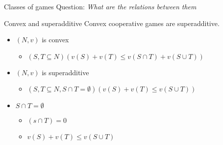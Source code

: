\documentclass{beamer}
\begin{document}
\begin{frame}{Classes of games}
    Question: \textit{What are the relations between them}
	\begin{block}{Convex and superadditive}
		Convex cooperative games are superadditive.
	\end{block}
	\begin{itemize}
		\item $(N,v)$ is convex
		\begin{itemize}
			\item $\left(S,T \subseteq N\right)\left(v(S)+v(T) \leq v\left(S \cap T\right)+v\left(S \cup T\right)\right)$
		\end{itemize}
		\item $(N,v)$ is superadditive
		\begin{itemize}
			\item $\left(S,T \subseteq N, S \cap T = \emptyset\right)\left(v(S)+v(T) \leq v\left(S \cup T\right)\right)$
		\end{itemize}
		\item $S \cap T = \emptyset$
		\begin{itemize}
			\item $\left(s \cap T\right) = 0$
			\item $v(S)+v(T) \leq v\left(S \cup T\right)$
		\end{itemize}
	\end{itemize}
\end{frame}

\end{document}
